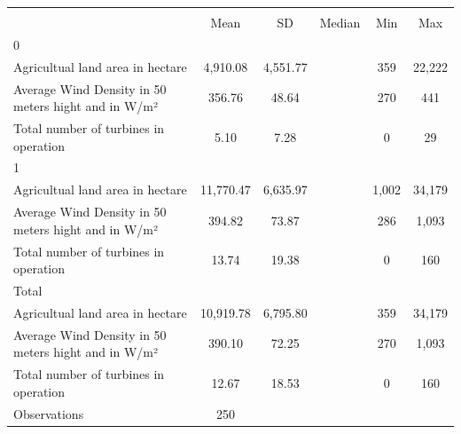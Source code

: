 {
\def\sym#1{\ifmmode^{#1}\else\(^{#1}\)\fi}
\begin{tabular}{l*{1}{ccccc}}
\toprule
                &\multicolumn{5}{c}{}                             \\
                &\multicolumn{1}{c}{{Mean}}&\multicolumn{1}{c}{{SD}}&\multicolumn{1}{c}{{Median}}&\multicolumn{1}{c}{{Min}}&\multicolumn{1}{c}{{Max}}\\
\midrule
0               &         &         &         &         &         \\
Agricultual land area in hectare& 4,910.08& 4,551.77&         &      359&   22,222\\
Average Wind Density in 50 meters hight and in W/m²&   356.76&    48.64&         &      270&      441\\
Total number of turbines in operation&     5.10&     7.28&         &        0&       29\\
\midrule
1               &         &         &         &         &         \\
Agricultual land area in hectare&11,770.47& 6,635.97&         &    1,002&   34,179\\
Average Wind Density in 50 meters hight and in W/m²&   394.82&    73.87&         &      286&    1,093\\
Total number of turbines in operation&    13.74&    19.38&         &        0&      160\\
\midrule
Total           &         &         &         &         &         \\
Agricultual land area in hectare&10,919.78& 6,795.80&         &      359&   34,179\\
Average Wind Density in 50 meters hight and in W/m²&   390.10&    72.25&         &      270&    1,093\\
Total number of turbines in operation&    12.67&    18.53&         &        0&      160\\
\midrule
Observations    &      250&         &         &         &         \\
\bottomrule
\end{tabular}
}
